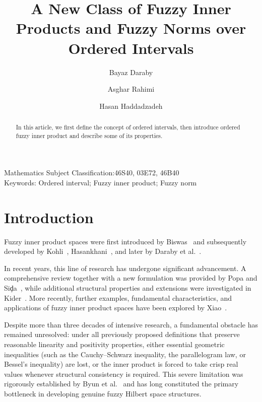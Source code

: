\documentclass[preprint,12pt]{elsarticle}
\theoremstyle{definition}
\begin{document}
	
	\title{\bf A New Class of Fuzzy Inner Products and Fuzzy Norms over Ordered Intervals}
	
\author[1]{Bayaz Daraby}

\author[1]{Asghar Rahimi}
\author[1]{Hasan Haddadzadeh}





\address[1]{Department of Mathematics, University of Maragheh, 
	P. O. Box 55136-553, Maragheh, Iran}

	
	\maketitle

	
		\allowdisplaybreaks
	\begin{abstract}
	
		In this article, we first define the concept of ordered intervals, then introduce  ordered fuzzy inner product and describe some of its properties.
	\end{abstract}
	
	\begin{footnotesize}
		Mathematics Subject Classification:46S40, 03E72, 46B40\\
		Keywords: Ordered interval; Fuzzy inner product; Fuzzy norm
	\end{footnotesize}
		\section{Introduction}
Fuzzy inner product spaces were first introduced by Biswas~\cite{Biswas1991} 
and subsequently developed by Kohli~\cite{Kohli1993}, 
Hasankhani~\cite{Hasankhani2010}, 
and later by Daraby et al.~\cite{Daraby2010Fuzzy,Daraby2019Some}.

In recent years, this line of research has undergone significant advancement. 
A comprehensive review together with a new formulation was provided by 
Popa and Si\c{d}a~\cite{PopaSida2021}, 
while additional structural properties and extensions were investigated in 
Kider~\cite{Kider2021}. 
More recently, further examples, fundamental characteristics, and applications of 
fuzzy inner product spaces have been explored by Xiao~\cite{Xiao2023}.

Despite more than three decades of intensive research, a fundamental obstacle has 
remained unresolved: under all previously proposed definitions that preserve reasonable 
linearity and positivity properties, either essential geometric inequalities 
(such as the Cauchy–Schwarz inequality, the parallelogram law, or Bessel’s inequality) 
are lost, or the inner product is forced to take crisp real values whenever structural 
consistency is required. This severe limitation was rigorously established by 
Byun et al.~\cite{Byun2020} and has long constituted the primary bottleneck 
in developing genuine fuzzy Hilbert space structures.
\end{document}
